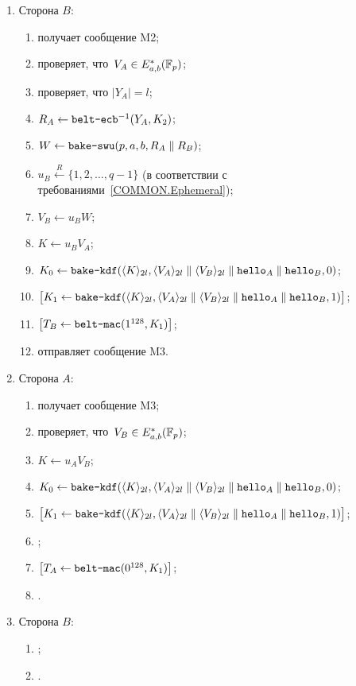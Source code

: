 \begin{enumerate}
\item
Сторона $B$:
\begin{enumerate}
\item
получает сообщение M2;
\item
проверяет, что~$V_A\in E_{a,b}^*(\mathbb{F}_p)$;
\item
проверяет, что $|Y_A|=l$;
\item
$R_A\leftarrow \texttt{belt-ecb}^{-1}(Y_A,K_2)$;
\item
$W\leftarrow\texttt{bake-swu}(p,a,b,R_A\parallel R_B)$;
\item
$u_B\stackrel{R}{\leftarrow}\{1,2,\ldots,q-1\}$
(в соответствии с требованиями~\ref{COMMON.Ephemeral});
\item
$V_B\leftarrow u_B W$;
\item
$K\leftarrow u_B V_A$;
\item
$K_0\leftarrow\texttt{bake-kdf}
(\langle K\rangle_{2l},
\langle V_A\rangle_{2l}\parallel
\langle V_B\rangle_{2l}\parallel
\texttt{hello}_A\parallel\texttt{hello}_B,
0)$;
\item
$\mathbf{\bigl[}K_1\leftarrow\texttt{bake-kdf}
(\langle K\rangle_{2l},
\langle V_A\rangle_{2l}\parallel
\langle V_B\rangle_{2l}\parallel
\texttt{hello}_A\parallel\texttt{hello}_B,
1)\mathbf{\bigr]}$;
\item
$\mathbf{\bigl[}T_B\leftarrow\texttt{belt-mac}(1^{128}, K_1)\mathbf{\bigr]}$;
\item
отправляет сообщение M3.
\end{enumerate}

\item
Сторона $A$:
\begin{enumerate}
\item
получает сообщение M3;
\item
проверяет, что~$V_B\in E_{a,b}^*(\mathbb{F}_p)$;
\item
$K\leftarrow u_A V_B$;
\item
$K_0\leftarrow\texttt{bake-kdf}
(\langle K\rangle_{2l},
\langle V_A\rangle_{2l}\parallel
\langle V_B\rangle_{2l}\parallel
\texttt{hello}_A\parallel\texttt{hello}_B,
0)$;
\item
$\mathbf{\bigl[}K_1\leftarrow\texttt{bake-kdf}
(\langle K\rangle_{2l},
\langle V_A\rangle_{2l}\parallel
\langle V_B\rangle_{2l}\parallel
\texttt{hello}_A\parallel\texttt{hello}_B,
1)\mathbf{\bigr]}$;
\item
{};
\item
$\mathbf{\bigl[}T_A\leftarrow\texttt{belt-mac}(0^{128}, K_1)\mathbf{\bigr]}$;
\item
{}.
\end{enumerate}

\item
Сторона $B$:
\begin{enumerate}
\item
{};
\item
{}.
\end{enumerate}
\end{enumerate}

